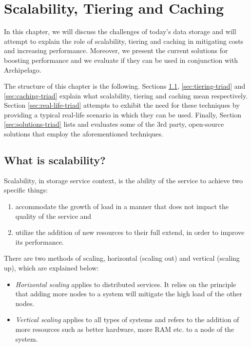 \chapter{Scalability, Tiering and Caching}\label{ch:triad}

In this chapter, we will discuss the challenges of today's data storage and 
will attempt to explain the role of scalability, tiering and caching in 
mitigating costs and increasing performance.  Moreover, we present the current 
solutions for boosting performance and we evaluate if they can be used in 
conjunction with Archipelago.

The structure of this chapter is the following. Sections 
\ref{sec:scalability-triad}, \ref{sec:tiering-triad} and 
\ref{sec:caching-triad} explain what scalability, tiering and caching mean 
respectively. Section \ref{sec:real-life-triad} attempts to exhibit the need 
for these techniques by providing a typical real-life scenario in which they 
can be used.  Finally, Section \ref{sec:solutions-triad} lists and evaluates 
some of the 3rd party, open-source solutions that employ the aforementioned 
techniques.

\section{What is scalability?}\label{sec:scalability-triad}

Scalability, in storage service context, is the ability of the service to 
achieve two specific things:
\begin{enumerate}
	\item accommodate the growth of load in a manner that does not impact 
		the quality of the service and
	\item utilize the addition of new resources to their full extend, in 
		order to improve its performance.
\end{enumerate}

There are two methods of scaling, horizontal (scaling out) and vertical 
(scaling up), which are explained below:

\begin{itemize}
	\item \textit{Horizontal scaling} applies to distributed services. It 
		relies on the principle that adding more nodes to a system will 
		mitigate the high load of the other nodes.
	\item \textit{Vertical scaling} applies to all types of systems and 
		refers to the addition of more resources such as better 
		hardware, more RAM etc. to a node of the system.
\end{itemize}

